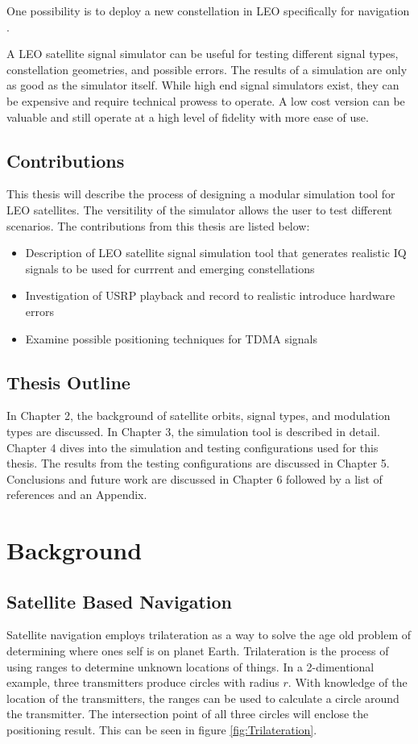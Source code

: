 \documentclass[12pt]{report}
\begin{document}
One possibility is to deploy a new constellation in LEO specifically for navigation  \cite{reidSatelliteNavigationAge2020}.


A LEO satellite signal simulator can be useful for testing different signal types, constellation geometries, and possible errors. The results of a simulation are only as good as the simulator itself. While high end signal simulators exist, they can be expensive and require technical prowess to operate. A low cost version can be valuable and still operate at a high level of fidelity with more ease of use. 

\section { Contributions}
This thesis will describe the process of designing a modular simulation tool for LEO satellites. The versitility of the simulator allows the user to test different scenarios. 
The contributions from this thesis are listed below:
\begin{itemize}
    \item Description of LEO satellite signal simulation tool that generates realistic IQ signals to be used for currrent and emerging constellations
    \item Investigation of USRP playback and record to realistic introduce hardware errors
    \item Examine possible positioning techniques for TDMA signals
    
\end{itemize}

\section{Thesis Outline}
In Chapter 2, the background of satellite orbits, signal types, and modulation types are discussed. In Chapter 3, the simulation tool is described in detail. Chapter 4 dives into the simulation and testing configurations used for this thesis. The results from the testing configurations are discussed in Chapter 5. Conclusions and future work are discussed in Chapter 6 followed by a list of references and an Appendix.


\chapter{Background}

\section{Satellite Based Navigation}\label{sec:satellitenav}
Satellite navigation employs trilateration as a way to solve the age old problem of determining where ones self is on planet Earth. Trilateration is the process of using ranges to determine unknown locations of things. In a 2-dimentional example, three transmitters produce circles with radius $r$. With knowledge of the location of the transmitters, the ranges can be used to calculate a circle around the transmitter. The intersection point of all three circles will enclose the positioning result. This can be seen in figure \ref{fig:Trilateration}.
\end{document}
